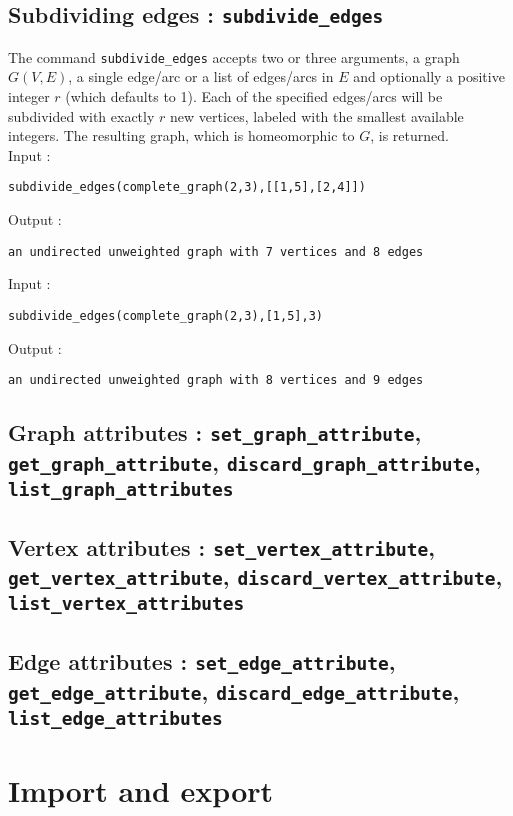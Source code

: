 \documentclass[a4paper,11pt]{article}
\begin{document}
\subsection{Subdividing edges : {\tt subdivide\_edges}}

The command {\tt subdivide\_edges} accepts two or three arguments, a graph $ G(V,E) $, a single edge/arc or a list of edges/arcs in $ E $ and optionally a positive integer $ r $ (which defaults to 1). Each of the specified edges/arcs will be subdivided with exactly $ r $ new vertices, labeled with the smallest available integers. The resulting graph, which is homeomorphic to $ G $, is returned.\\
Input :
\begin{center}
  \tt subdivide\_edges(complete\_graph(2,3),[[1,5],[2,4]])
\end{center}
Output :
\begin{center}
  \tt an undirected unweighted graph with 7 vertices and 8 edges
\end{center}
Input :
\begin{center}
  \tt subdivide\_edges(complete\_graph(2,3),[1,5],3)
\end{center}
Output :
\begin{center}
  \tt an undirected unweighted graph with 8 vertices and 9 edges
\end{center}

\subsection{Graph attributes : {\tt set\_graph\_attribute}, {\tt get\_graph\_attribute}, {\tt discard\_graph\_attribute}, {\tt list\_graph\_attributes}}

\subsection{Vertex attributes : {\tt set\_vertex\_attribute}, {\tt get\_vertex\_attribute}, {\tt discard\_vertex\_attribute}, {\tt list\_vertex\_attributes}}

\subsection{Edge attributes : {\tt set\_edge\_attribute}, {\tt get\_edge\_attribute}, {\tt discard\_edge\_attribute}, {\tt list\_edge\_attributes}}

\section{Import and export}
\end{document}
